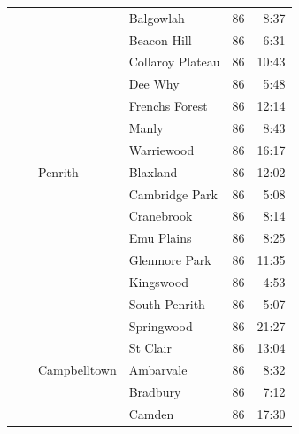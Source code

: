 \documentclass{grattan}
\begin{document}
\begin{longtable}{Nlllrr}
 &                                &                       & Balgowlah            & 86  & 8:37 \\
 &                                &                       & Beacon Hill          & 86  & 6:31 \\
 &                                &                       & Collaroy Plateau     & 86  & 10:43 \\
 &                                &                       & Dee Why              & 86  & 5:48 \\
 &                                &                       & Frenchs Forest       & 86  & 12:14 \\
 &                                &                       & Manly                & 86  & 8:43 \\
 &                                &                       & Warriewood           & 86  & 16:17 \\
 &                                & Penrith               & Blaxland             & 86  & 12:02 \\
 &                                &                       & Cambridge Park       & 86  & 5:08 \\
 &                                &                       & Cranebrook           & 86  & 8:14 \\
 &                                &                       & Emu Plains           & 86  & 8:25 \\
 &                                &                       & Glenmore Park        & 86  & 11:35 \\
 &                                &                       & Kingswood            & 86  & 4:53 \\
 &                                &                       & South Penrith        & 86  & 5:07 \\
 &                                &                       & Springwood           & 86  & 21:27 \\
 &                                &                       & St Clair             & 86  & 13:04 \\
 &                                & Campbelltown          & Ambarvale            & 86  & 8:32 \\
 &                                &                       & Bradbury             & 86  & 7:12 \\
 &                                &                       & Camden               & 86  & 17:30 \\

\end{longtable}
\end{document}
